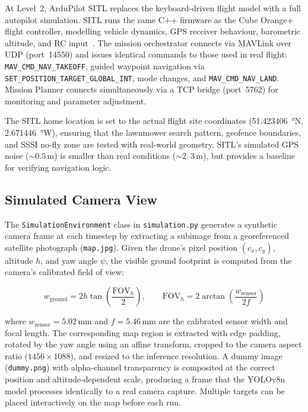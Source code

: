 At Level~2, ArduPilot SITL replaces the keyboard-driven flight model with a full autopilot simulation. SITL runs the same C++ firmware as the Cube Orange+ flight controller, modelling vehicle dynamics, GPS receiver behaviour, barometric altitude, and RC input~\cite{ardupilot2024}. The mission orchestrator connects via MAVLink over UDP (port~14550) and issues identical commands to those used in real flight: \texttt{MAV\_CMD\_NAV\_TAKEOFF}, guided waypoint navigation via \texttt{SET\_POSITION\_TARGET\_GLOBAL\_INT}, mode changes, and \texttt{MAV\_CMD\_NAV\_LAND}. Mission Planner connects simultaneously via a TCP bridge (port~5762) for monitoring and parameter adjustment.

The SITL home location is set to the actual flight site coordinates (\SI{51.423406}{\degree}N, \SI{2.671446}{\degree}W), ensuring that the lawnmower search pattern, geofence boundaries, and SSSI no-fly zone are tested with real-world geometry. SITL's simulated GPS noise (${\sim}0.5$\,m) is smaller than real conditions (${\sim}2$--3\,m), but provides a baseline for verifying navigation logic.

\subsection{Simulated Camera View}\label{sec:sim-camera}

The \texttt{SimulationEnvironment} class in \texttt{simulation.py} generates a synthetic camera frame at each timestep by extracting a subimage from a georeferenced satellite photograph (\texttt{map.jpg}). Given the drone's pixel position $(c_x, c_y)$, altitude $h$, and yaw angle $\psi$, the visible ground footprint is computed from the camera's calibrated field of view:

\begin{equation}
    w_{\text{ground}} = 2h \tan\!\left(\frac{\text{FOV}_h}{2}\right), \qquad \text{FOV}_h = 2\arctan\!\left(\frac{w_{\text{sensor}}}{2f}\right)
\end{equation}

\noindent where $w_{\text{sensor}} = 5.02$\,mm and $f = 5.46$\,mm are the calibrated sensor width and focal length. The corresponding map region is extracted with edge padding, rotated by the yaw angle using an affine transform, cropped to the camera aspect ratio ($1456 \times 1088$), and resized to the inference resolution. A dummy image (\texttt{dummy.png}) with alpha-channel transparency is composited at the correct position and altitude-dependent scale, producing a frame that the YOLOv8n model processes identically to a real camera capture. Multiple targets can be placed interactively on the map before each run.

